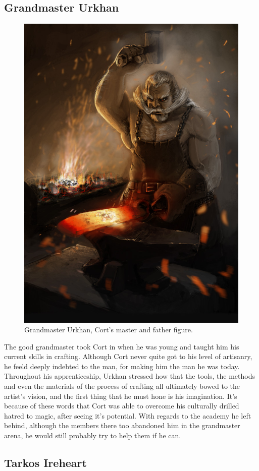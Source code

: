 \documentclass[12pt]{article}
\begin{document}
\subsection{Grandmaster Urkhan}

\begin{figure}[!htb]
  \centering
  \includegraphics[width=.5\textwidth]{./resources/urkhan}
  \caption{Grandmaster Urkhan, Cort's master and father figure.}
\end{figure}

The good grandmaster took Cort in when he was young and taught him his current
skills in crafting. Although Cort never quite got to his level of artisanry, he
feeld deeply indebted to the man, for making him the man he was today.
Throughout his apprenticeship, Urkhan stressed how that the tools, the methods
and even the materials of the process of crafting all ultimately bowed to the
artist's vision, and the first thing that he must hone is his imagination. It's
because of these words that Cort was able to overcome his culturally drilled
hatred to magic, after seeing it's potential. With regards to the academy he
left behind, although the members there too abandoned him in the grandmaster
arena, he would still probably try to help them if he can.

\subsection{Tarkos Ireheart}
\end{document}
